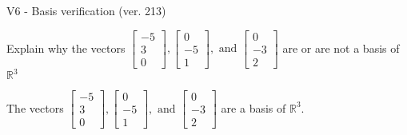 \begin{exercise}
  \begin{exerciseTitle}V6 - Basis verification (ver. 213)\end{exerciseTitle}
  \begin{exerciseStatement}
    Explain why the vectors \(\left[\begin{array}{r}
-5 \\
3 \\
0
\end{array}\right] , \left[\begin{array}{r}
0 \\
-5 \\
1
\end{array}\right] , \text{ and } \left[\begin{array}{r}
0 \\
-3 \\
2
\end{array}\right]\) are or are not a basis of \(\mathbb{R}^3\)	


  \end{exerciseStatement}
  \begin{exerciseAnswer}
   The vectors \(\left[\begin{array}{r}
-5 \\
3 \\
0
\end{array}\right] , \left[\begin{array}{r}
0 \\
-5 \\
1
\end{array}\right] , \text{ and } \left[\begin{array}{r}
0 \\
-3 \\
2
\end{array}\right]\) 
  	 are  a basis of \(\mathbb{R}^3\).
  


  \end{exerciseAnswer}
\end{exercise}